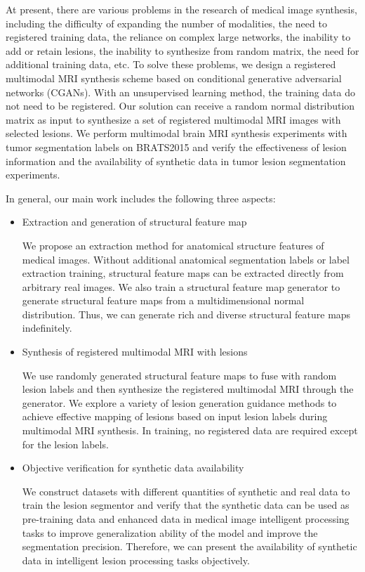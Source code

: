 \documentclass[runningheads]{llncs}
\begin{document}
At present, there are various problems in the research of medical image synthesis, including the difficulty of expanding the number of modalities, the need to registered training data, the reliance on complex large networks, the inability to add or retain lesions, the inability to synthesize from random matrix, the need for additional training data, etc. 
To solve these problems, we design a registered multimodal MRI synthesis scheme based on  conditional generative adversarial networks (CGANs)\cite{70mirza2014conditional}. With an unsupervised learning method, the training data do not need to be registered. Our solution can receive a random normal distribution matrix as input to synthesize a set of registered multimodal MRI images with selected lesions. We perform multimodal brain MRI synthesis experiments with tumor segmentation labels on BRATS2015 and verify the effectiveness of lesion information and the availability of synthetic data in tumor lesion segmentation experiments. 

In general, our main work includes the following three aspects:

\begin{itemize}
	\item{Extraction and generation of structural feature map}
	
	We propose an extraction method for anatomical structure features of medical images. Without additional anatomical segmentation labels or label extraction training, structural feature maps can be extracted directly from arbitrary real images. We also train a structural feature map generator to generate structural feature maps from a multidimensional normal distribution. Thus, we can generate rich and diverse structural feature maps indefinitely.
	
	\item{Synthesis of registered multimodal MRI with lesions}	
	
	We use randomly generated structural feature maps to fuse with random lesion labels and then synthesize the registered multimodal MRI through the generator. We explore a variety of lesion generation guidance methods to achieve effective mapping of lesions based on input lesion labels during multimodal MRI synthesis. In training, no registered data are required except for the lesion labels. 
	
	\item{Objective verification for synthetic data availability}
	
	We construct datasets with different quantities of synthetic and real data to train the lesion segmentor and verify that the synthetic data can be used as pre-training data and enhanced data in medical image intelligent processing tasks to improve generalization ability of the model and improve the segmentation precision. Therefore, we can present the availability of synthetic data in intelligent lesion processing tasks objectively.
\end{itemize}
\end{document}
